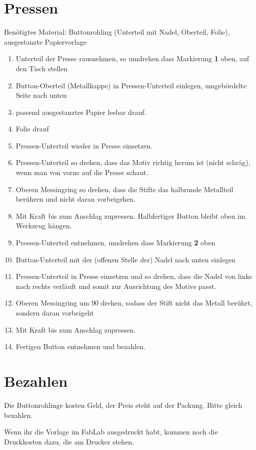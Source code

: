 \documentclass{\basedir/fablab-document}
\begin{document}
\section{Pressen}
Benötigtes Material: Buttonrohling (Unterteil mit Nadel, Oberteil, Folie), ausgestanzte Papiervorlage
\begin{enumerate}
  \item Unterteil der Presse rausnehmen, so umdrehen dass Markierung \textbf{1} oben, auf den Tisch stellen
  \item Button-Oberteil (Metallkappe) in Pressen-Unterteil einlegen, umgebördelte Seite nach unten
  \item passend ausgestanztes Papier lesbar drauf.
  \item Folie drauf
  \item Pressen-Unterteil wieder in Presse einsetzen.
  \item Pressen-Unterteil so drehen, dass das Motiv richtig herum ist (nicht schräg), wenn man von vorne auf die Presse schaut.
  \item Oberen Messingring so drehen, dass die Stifte  das halbrunde Metallteil berühren und nicht daran vorbeigehen.
  \item Mit Kraft bis zum Anschlag zupressen. Halbfertiger Button bleibt oben im Werkzeug hängen.
  \item Pressen-Unterteil entnehmen, umdrehen dass Markierung \textbf{2} oben
  \item Button-Unterteil mit der (offenen Stelle der) Nadel nach unten einlegen
  \item Pressen-Unterteil in Presse einsetzen und so drehen, dass die Nadel von links nach rechts verläuft und somit zur Ausrichtung des Motivs passt.
  \item Oberen Messingring um 90\textdegree{} drehen, sodass der Stift nicht das Metall berührt, sondern daran vorbeigeht
  \item Mit Kraft bis zum Anschlag zupressen.
  \item Fertigen Button entnehmen und bezahlen.
\end{enumerate}

\section{Bezahlen}
Die Buttonrohlinge kosten Geld, der Preis steht auf der Packung. Bitte gleich bezahlen.

Wenn ihr die Vorlage im FabLab ausgedruckt habt, kommen noch die Druckkosten dazu, die am Drucker stehen.

\end{document}
